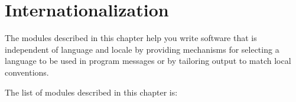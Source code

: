 \chapter{Internationalization}
\label{i18n}

The modules described in this chapter help you write
software that is independent of language and locale
by providing mechanisms for selecting a language to be used in 
program messages or by tailoring output to match local conventions.

The list of modules described in this chapter is:

\localmoduletable
